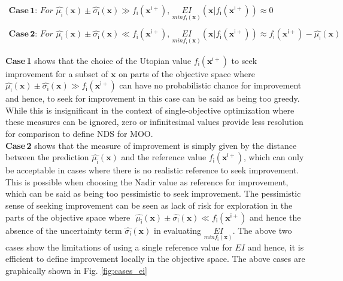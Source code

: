 \begin{equation}
\begin{array}{l}
\mathbf{Case\,1:}\,
For \,\, \hat{\mu_{\mathsf{i}}}(\bm{x})\pm \hat{\sigma_{\mathsf{i}}}(\bm{x})\gg f_{\mathsf{i}}(\bm x^{\mathsf{i}+}), \, \underset{min f_{\mathsf{i}}(\bm{x})}{EI}(\bm{x}|f_{\mathsf{i}}(\bm x^{\mathsf{i}+}))\approx0\\
\\
\mathbf{Case\,2:}\,
For \,\, \hat{\mu_{\mathsf{i}}}(\bm{x})\pm \hat{\sigma_{\mathsf{i}}}(\bm{x}) \ll f_{\mathsf{i}}(\bm x^{\mathsf{i}+}), \,\underset{min f_{\mathsf{i}}(\bm{x})}{EI}(\bm{x}|f_{\mathsf{i}}(\bm x^{\mathsf{i}+}))\approx  f_{\mathsf{i}}(\bm x^{\mathsf{i}+})-\hat{\mu_{\mathsf{i}}}(\bm{x})
\end{array}
\end{equation}

 {\textbf{Case\,1}} shows that the choice of the Utopian value $f_{\mathsf{i}}(\bm x^{\mathsf{i}+})$ to seek improvement for a subset of $\bm{x}$ on parts of the objective space where $\hat{\mu_{\mathsf{i}}}(\bm{x})\pm \hat{\sigma_{\mathsf{i}}}(\bm{x})\gg f_{\mathsf{i}}(\bm x^{\mathsf{i}+})$ can have no probabilistic chance for improvement and hence, to seek for improvement in this case can be said as being too greedy. While this is insignificant in the context of single-objective optimization where these measures can be ignored, zero or infinitesimal values provide less resolution for comparison to define NDS for MOO.\\

{\textbf{Case\,2}} shows that the measure of improvement is simply given by the distance between the prediction $\hat{\mu_{\mathsf{i}}}(\bm{x})$ and the reference value $f_{\mathsf{i}}(\bm x^{\mathsf{i}+})$, which can only be acceptable in cases where there is no realistic reference to seek improvement. This is possible when choosing the Nadir value as reference for improvement, which can be said as being too pessimistic to seek improvement. The pessimistic sense of seeking improvement can be seen as lack of risk for exploration in the parts of the objective space where $\,\, \hat{\mu_{\mathsf{i}}}(\bm{x})\pm \hat{\sigma_{\mathsf{i}}}(\bm{x}) \ll f_{\mathsf{i}}(\bm x^{\mathsf{i}+})$ and hence the absence of the uncertainty term $\hat{\sigma_{\mathsf{i}}}(\bm{x})$ in evaluating $\underset{min f_{\mathsf{i}}(\bm{x})}{EI}$. The above two cases show the limitations of using a single reference value for $EI$ and hence, it is efficient to define improvement locally in the objective space. The above cases are graphically shown in Fig. \ref{fig:cases_ei} \\

